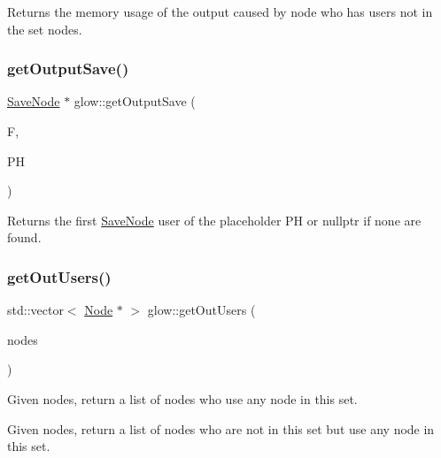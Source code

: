 \begin{DoxyReturn}{Returns}
the memory usage of the output caused by {\ttfamily node} who has users not in the set {\ttfamily nodes}. 
\end{DoxyReturn}
\mbox{\label{namespaceglow_a493b517e027e3c2689248c644f3747b5}} 
\subsubsection{\texorpdfstring{get\+Output\+Save()}{getOutputSave()}}
{\footnotesize\ttfamily \hyperlink{classglow_1_1_save_node}{Save\+Node} $\ast$ glow\+::get\+Output\+Save (\begin{DoxyParamCaption}\item[{\hyperlink{classglow_1_1_function}{Function} $\ast$}]{F,  }\item[{\hyperlink{classglow_1_1_placeholder}{Placeholder} $\ast$}]{PH }\end{DoxyParamCaption})}

\begin{DoxyReturn}{Returns}
the first \hyperlink{classglow_1_1_save_node}{Save\+Node} user of the placeholder {\ttfamily PH} or nullptr if none are found. 
\end{DoxyReturn}
\mbox{\label{namespaceglow_ace2ce9f3fea11d339cd0605fe8ece061}} 
\subsubsection{\texorpdfstring{get\+Out\+Users()}{getOutUsers()}}
{\footnotesize\ttfamily std\+::vector$<$ \hyperlink{classglow_1_1_node}{Node} $\ast$ $>$ glow\+::get\+Out\+Users (\begin{DoxyParamCaption}\item[{const Nodes\+Set \&}]{nodes }\end{DoxyParamCaption})}



Given {\ttfamily nodes}, return a list of nodes who use any node in this set. 

Given {\ttfamily nodes}, return a list of nodes who are not in this set but use any node in this set. \mbox{\label{namespaceglow_a352ec64282f28b5487a23bf2d805a528}} 
